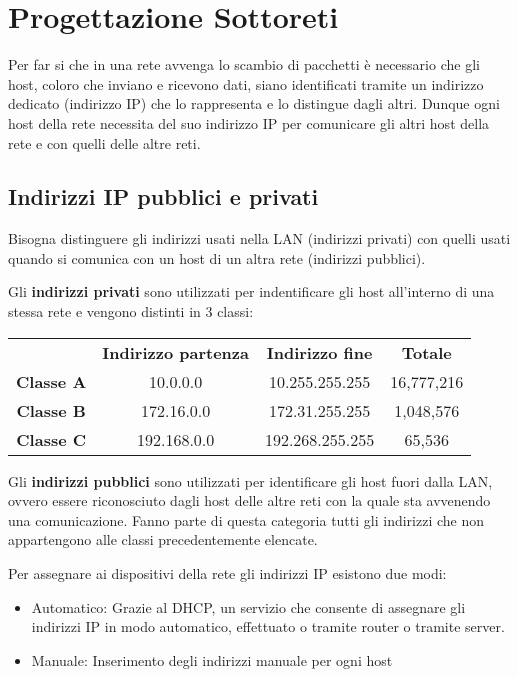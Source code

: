 \section{Progettazione Sottoreti}
Per far si che in una rete avvenga lo scambio di pacchetti è necessario che gli host, coloro che inviano e ricevono dati, siano identificati tramite un indirizzo dedicato (indirizzo IP) che lo rappresenta e lo distingue dagli altri.
Dunque ogni host della rete necessita del suo indirizzo IP per comunicare gli altri host della rete e con quelli delle altre reti.

\subsection{Indirizzi IP pubblici e privati}

Bisogna distinguere gli indirizzi usati nella LAN (indirizzi privati) con quelli usati quando si comunica con un host di un altra rete (indirizzi pubblici).

Gli \textbf{indirizzi privati} sono utilizzati per indentificare gli host all'interno di una stessa rete e vengono distinti in 3 classi:

\medskip

\begin{tabular}{cccc}
     & \textbf{Indirizzo partenza} & \textbf{Indirizzo fine} & \textbf{Totale}\\
    \textbf{Classe A} & 10.0.0.0 & 10.255.255.255 & 16,777,216\\
    \textbf{Classe B} & 172.16.0.0 & 172.31.255.255 & 1,048,576\\
    \textbf{Classe C} & 192.168.0.0 & 192.268.255.255 & 65,536\\
\end{tabular}

\medskip

Gli \textbf{indirizzi pubblici} sono utilizzati per identificare gli host fuori dalla LAN, ovvero essere riconosciuto dagli host delle altre reti con la quale sta avvenendo una comunicazione. Fanno parte di questa categoria tutti gli indirizzi che non appartengono alle classi precedentemente elencate.

Per assegnare ai dispositivi della rete gli indirizzi IP esistono due modi:
\begin{itemize}
    \item Automatico: Grazie al DHCP, un servizio che consente di assegnare gli indirizzi IP in modo automatico, effettuato o tramite router o tramite server.
    \item Manuale: Inserimento degli indirizzi manuale per ogni host
\end{itemize}

